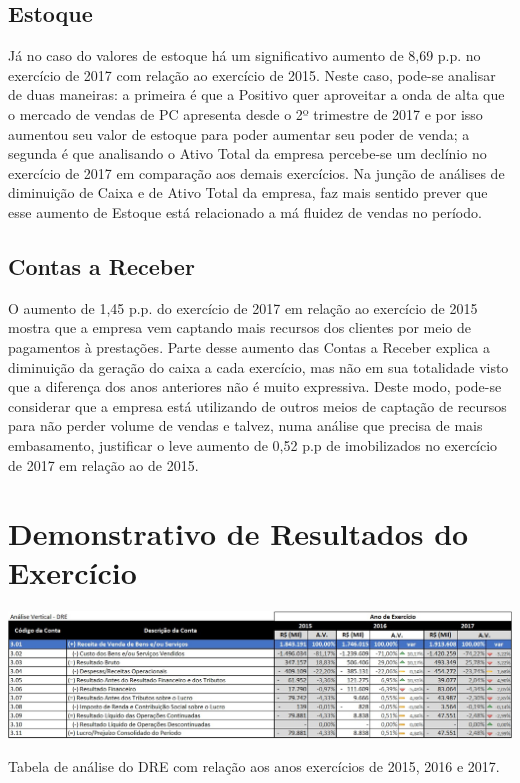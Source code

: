 \subsection{Estoque}
Já no caso do valores de estoque há um significativo aumento de 8,69 p.p. no exercício de 2017 com relação ao exercício de 2015. Neste caso, pode-se analisar de duas maneiras: a primeira é que a Positivo quer aproveitar a onda de alta que o mercado de vendas de PC apresenta desde o 2º trimestre de 2017 e por isso aumentou seu valor de estoque para poder aumentar seu poder de venda; a segunda é que analisando o Ativo Total da empresa percebe-se um declínio no exercício de 2017 em comparação aos demais exercícios. Na junção de análises de diminuição de Caixa e de Ativo Total da empresa, faz mais sentido prever que esse aumento de Estoque está relacionado a má fluidez de vendas no período.

\subsection{Contas a Receber}

O aumento de 1,45 p.p. do exercício de 2017 em relação ao exercício de 2015 mostra que a empresa vem captando mais recursos dos clientes por meio de pagamentos à prestações. Parte desse aumento das Contas a Receber explica a diminuição da geração do caixa a cada exercício, mas não em sua totalidade visto que a diferença dos anos anteriores não é muito expressiva. Deste modo, pode-se considerar que a empresa está utilizando de outros meios de captação de recursos para não perder volume de vendas e talvez, numa análise que precisa de mais embasamento, justificar o leve aumento de 0,52 p.p de imobilizados no exercício de 2017 em relação ao de 2015.

\section{Demonstrativo de Resultados do Exercício}

\begin{table}[h]
\begin{centering}
\includegraphics[width=1.0\textwidth]{Img/AnaliseVerticalDre}
\caption{Tabela de análise do DRE com relação aos anos exercícios de 2015, 2016 e 2017.}
\par\end{centering}
\end{table}

